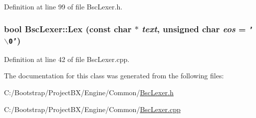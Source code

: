 Definition at line 99 of file BscLexer.h.\hypertarget{class_bsc_lexer_710aec711fc9f9e7767378d5698e3678}{
\subsubsection[{Lex}]{\setlength{\rightskip}{0pt plus 5cm}bool BscLexer::Lex (const char $\ast$ {\em text}, \/  unsigned char {\em eos} = {\tt '$\backslash$0'})}}
\label{class_bsc_lexer_710aec711fc9f9e7767378d5698e3678}




Definition at line 42 of file BscLexer.cpp.

The documentation for this class was generated from the following files:\begin{CompactItemize}
\item 
C:/Bootstrap/ProjectBX/Engine/Common/\hyperlink{_bsc_lexer_8h}{BscLexer.h}\item 
C:/Bootstrap/ProjectBX/Engine/Common/\hyperlink{_bsc_lexer_8cpp}{BscLexer.cpp}\end{CompactItemize}
